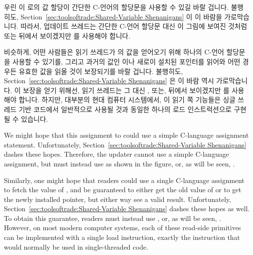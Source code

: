 우린 이  로의 값 할당이 간단한 C-언어의 할당문을 사용할 수 있길 바랄
겁니다.
불행히도,
Section~\ref{sec:toolsoftrade:Shared-Variable Shenanigans}
이 이 바람을 가로막습니다.
따라서, 업데이트 쓰레드는 간단한 C-언어 할당문 대신 이 그림에 보여진 것처럼
 또는 뒤에서 보이겠지만  를
사용해야 합니다.

비슷하게, 어떤 사람들은 읽기 쓰레드가  의 값을 얻어오기 위해 하나의
C-언어 할당문을 사용할 수 있기를, 그리고 과거의 값인  이나 새로이
설치된 포인터를 읽어와 어떤 경우든 유효한 값을 읽올 것이 보장되기를 바랄
겁니다.
불행히도,
Section~\ref{sec:toolsoftrade:Shared-Variable Shenanigans}
은 이 바람 역시 가로막습니다.
이 보장을 얻기 위해선, 읽기 쓰레드는 그 대신 , 또는, 뒤에서
보이겠지만  를 사용해야 합니다.
하지만, 대부분의 현대 컴퓨터 시스템에서, 이 읽기 쪽 기능들은 싱글 쓰레드 기반
코드에서 일반적으로 사용될 것과 동일한 하나의 로드 인스트럭션으로 구현될 수
있습니다.

\iffalse

We might hope that this assignment to  could use a simple
C-language assignment statement.
Unfortunately,
Section~\ref{sec:toolsoftrade:Shared-Variable Shenanigans}
dashes these hopes.
Therefore, the updater cannot use a simple C-language assignment, but
must instead use  as shown in the figure,
or, as will be seen, .

Similarly, one might hope that readers could use a single C-language
assignment to fetch the value of , and be guaranteed to either
get the old value of  or to get the newly installed pointer,
but either way see a valid result.
Unfortunately, Section~\ref{sec:toolsoftrade:Shared-Variable Shenanigans}
dashes these hopes as well.
To obtain this guarantee, readers must instead use ,
or, as will be seen, .
However, on most modern computer systems, each of these read-side primitives
can be implemented with a single load instruction, exactly the instruction
that would normally be used in single-threaded code.

